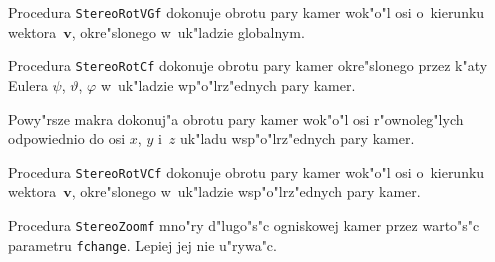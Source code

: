 \vspace{\bigskipamount}
Procedura \texttt{StereoRotVGf} dokonuje obrotu pary kamer wok"o"l osi
o~kierunku wektora~$\bm{v}$, okre"slonego w~uk"ladzie globalnym.

\vspace{\bigskipamount}
Procedura \texttt{StereoRotCf} dokonuje obrotu pary kamer okre"slonego przez
k"aty Eulera $\psi$, $\vartheta$, $\varphi$ w~uk"ladzie wp"o"lrz"ednych pary
kamer.

\newpage
Powy"rsze makra dokonuj"a obrotu pary kamer wok"o"l osi r"ownoleg"lych
odpowiednio do osi $x$, $y$ i~$z$ uk"ladu wsp"o"lrz"ednych pary kamer.

\vspace{\bigskipamount}
Procedura \texttt{StereoRotVCf} dokonuje obrotu pary kamer wok"o"l osi
o~kierunku wektora~$\bm{v}$, okre"slonego w~uk"ladzie wsp"o"lrz"ednych pary
kamer.

\vspace{\bigskipamount}
Procedura \texttt{StereoZoomf} mno"ry d"lugo"s"c ogniskowej kamer przez
warto"s"c parametru \texttt{fchange}. Lepiej jej nie u"rywa"c.


